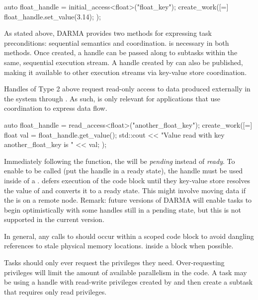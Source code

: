 \begin{CppCode}
auto float_handle = initial_access<float>("float_key");
create_work([=]{
  float_handle.set_value(3.14);
});
\end{CppCode}
As stated above, DARMA provides two methods for expressing task preconditions: sequential semantics and coordination.
 is necessary in both methods.
Once created, a handle can be passed along to subtasks within the same, sequential execution stream.
A handle created by  can also be published, making it available to other execution streams via key-value store coordination.

Handles of Type 2 above request read-only access to data produced externally in the system through . 
As such,  is only relevant for applications that use coordination to express data flow.
\begin{CppCode}
auto float_handle = read_access<float>("another_float_key");
create_work([=]{
  float val = float_handle.get_value();
  std::cout << "Value read with key another_float_key is " << val;  
});
\end{CppCode}

Immediately following the  function, the \ahandle will be \emph{pending} instead of \emph{ready}.
To enable  to be called (put the handle in a ready state), the handle must be used inside of a .
\cwork defers execution of the code block until they key-value store resolves the value of  and converts it to a ready state.
This might involve moving data if the  is on a remote node.
Remark: future versions of DARMA will enable tasks to begin optimistically with some handles still in a pending state, but this is not supported in the current version.

In general, any calls to  should occur 
within a scoped code block to avoid dangling references to stale physical memory locations.
inside a  block when possible.

Tasks should only ever request the privileges they need. 
Over-requesting privileges will limit the amount of available parallelism in the code.
A task may be using a handle with read-write privileges created by 
and then create a subtask that requires only read privileges.

